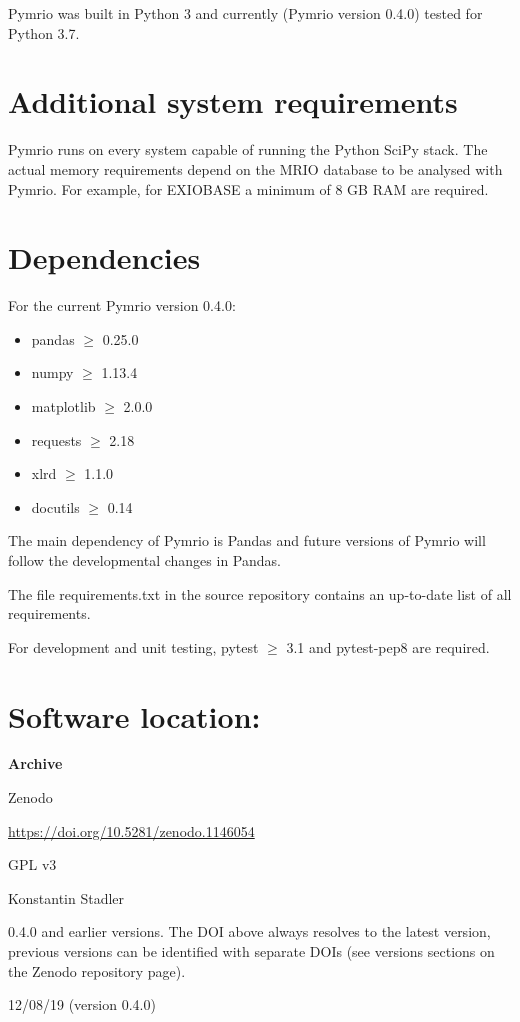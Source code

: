 \documentclass{jors}
\begin{document}
Pymrio was built in Python 3 and currently (Pymrio version 0.4.0) tested for Python 3.7.


\section*{Additional system requirements}

Pymrio runs on every system capable of running the Python SciPy stack.
The actual memory requirements depend on the MRIO database to be analysed with Pymrio. For example, for EXIOBASE \cite{stadler2018b} a minimum of 8 GB RAM are required. 

\section*{Dependencies}

For the current Pymrio version 0.4.0:

\begin{itemize}
    \item pandas $\ge$ 0.25.0
    \item numpy $\ge$ 1.13.4
    \item matplotlib $\ge$ 2.0.0
    \item requests $\ge$ 2.18
    \item xlrd $\ge$ 1.1.0 
    \item docutils $\ge$ 0.14 
\end{itemize}

The main dependency of Pymrio is Pandas and future versions of Pymrio will follow the developmental changes in Pandas.

The file requirements.txt in the source repository contains an up-to-date list of all requirements.

For development and unit testing, pytest $\ge$ 3.1 \cite{krekl2017} and pytest-pep8 are required.

\section*{Software location:}

{\bf Archive} 

\begin{description}[noitemsep,topsep=0pt]
	\item[Name:] Zenodo
    \item[Persistent identifier:] \url{https://doi.org/10.5281/zenodo.1146054}
	\item[Licence:] GPL v3
	\item[Publisher:]  Konstantin Stadler
    \item[Version published:] 0.4.0 and earlier versions. The DOI above always resolves to the latest version, previous versions can be identified with separate DOIs (see versions sections on the Zenodo repository page). 
    \item[Date published:] 12/08/19 (version 0.4.0)
\end{description}
\end{document}
